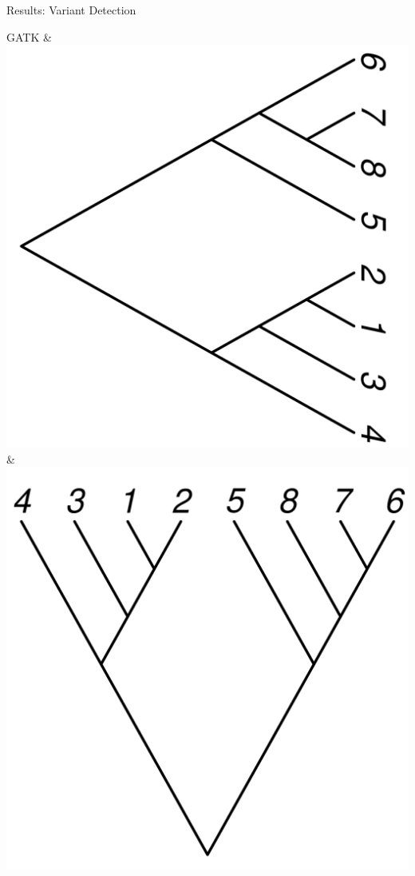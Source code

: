 \documentclass{beamer}
\begin{document}
\begin{frame}{}
\begin{columns}
\begin{block}{Results: Variant Detection}
\begin{center}
\begin{tabu}
 GATK & \includegraphics[width=.95\linewidth]{gatk_tree_rightwards.pdf} & \includegraphics[width=.95\linewidth,angle=90]{true_tree.pdf} \\

\end{tabu}
\end{center}
\end{block}
\end{columns}
\end{frame}
\end{document}
